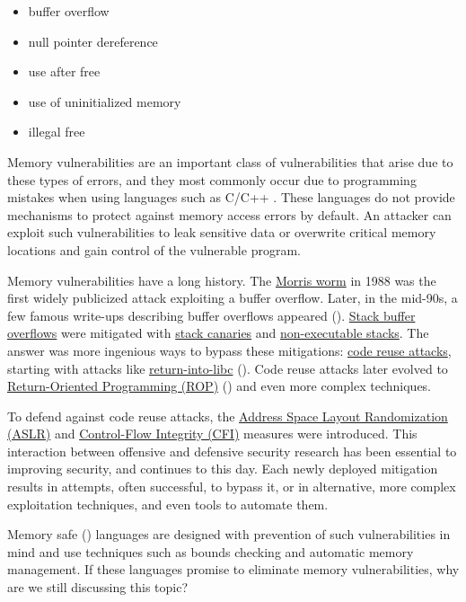 \documentclass[
  a4paper,
]{report}
\providecommand{\tightlist}{%
  \setlength{\itemsep}{0pt}\setlength{\parskip}{0pt}}
\begin{document}
\begin{itemize}
\tightlist
\item
  buffer overflow
\item
  null pointer dereference
\item
  use after free
\item
  use of uninitialized memory
\item
  illegal free
\end{itemize}

Memory vulnerabilities are an important class of vulnerabilities that
arise due to these types of errors, and they most commonly occur due to
programming mistakes when using languages such as C/C++
. These languages do not provide mechanisms to
protect against memory access errors by default. An attacker can exploit
such vulnerabilities to leak sensitive data or overwrite critical memory
locations and gain control of the vulnerable program.

Memory vulnerabilities have a long history. The
\href{https://en.wikipedia.org/wiki/Morris_worm}{Morris worm} in 1988
was the first widely publicized attack exploiting a buffer overflow.
Later, in the mid-90s, a few famous write-ups describing buffer
overflows appeared ().
\hyperref[stack-buffer-overflows]{Stack buffer overflows} were mitigated
with \hyperref[stack-buffer-overflows]{stack canaries} and
\hyperref[stack-buffer-overflows]{non-executable stacks}. The answer was
more ingenious ways to bypass these mitigations:
\hyperref[code-reuse-attacks]{code reuse attacks}, starting with attacks
like \hyperref[code-reuse-attacks]{return-into-libc}
(). Code reuse attacks
later evolved to \hyperref[return-oriented-programming]{Return-Oriented
Programming (ROP)} () and even
more complex techniques.

To defend against code reuse attacks, the \hyperref[aslr]{Address Space
Layout Randomization (ASLR)} and
\hyperref[control-flow-integrity-cfi]{Control-Flow Integrity (CFI)}
measures were introduced. This interaction between offensive and
defensive security research has been essential to improving security,
and continues to this day. Each newly deployed mitigation results in
attempts, often successful, to bypass it, or in alternative, more
complex exploitation techniques, and even tools to automate them.

Memory safe () languages are
designed with prevention of such vulnerabilities in mind and use
techniques such as bounds checking and automatic memory management. If
these languages promise to eliminate memory vulnerabilities, why are we
still discussing this topic?
\end{document}
